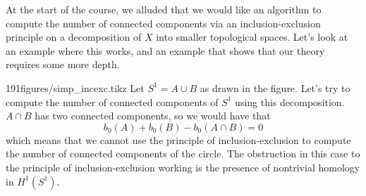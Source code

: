 At the start of the course, we alluded that we would like an algorithm to compute the number of connected components via an inclusion-exclusion principle on a decomposition of $X$ into smaller topological spaces. Let's look at an example where this works, and an example that shows that our theory requires some more depth. 
\begin{examplefigureenv}{191figures/simp_incexc.tikz}
	Let $S^1=A\cup B$ as drawn in the figure. Let's try to compute the number of connected components of $S^1$ using this decomposition. $A\cap B$ has two connected components, so we would have that 
\[b_0(A)+b_0(B)-b_0(A\cap B)=0\]
which means that we cannot use the principle of inclusion-exclusion to compute the number of connected components of the circle. The obstruction in this case to the principle of inclusion-exclusion working is the presence of nontrivial homology in $H^1(S^1)$.  
\end{examplefigureenv}

